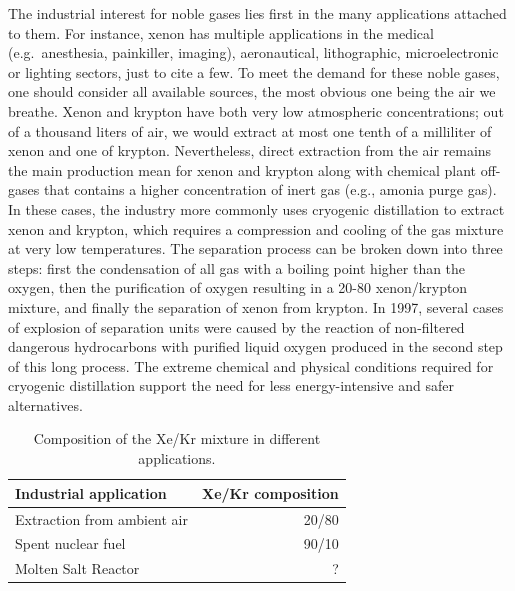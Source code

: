 \documentclass[main.tex]{subfiles}
\begin{document}
The industrial interest for noble gases lies first in the many applications attached to them. For instance, xenon has multiple applications in the medical (e.g.\ anesthesia, painkiller, imaging),\autocite{cullen1951anesthetic, holstrater2011intranasal,Mammarappallil_2019} aeronautical\autocite{Patterson_2002,Coxhill_2005}, lithographic\autocite{Abramov_2018}, microelectronic\autocite{Chang_1995} or lighting sectors,\autocite{Jarman_1974,Tanaka_2019} just to cite a few. To meet the demand for these noble gases, one should consider all available sources, the most obvious one being the air we breathe. Xenon and krypton have both very low atmospheric concentrations; out of a thousand liters of air, we would extract at most one tenth of a milliliter of xenon and one of krypton.\autocite{kerry2007industrial} Nevertheless, direct extraction from the air remains the main production mean for xenon and krypton along with chemical plant off-gases that contains a higher concentration of inert gas (e.g., amonia purge gas). In these cases, the industry more commonly uses cryogenic distillation to extract xenon and krypton, which requires a compression and cooling of the gas mixture at very low temperatures. The separation process can be broken down into three steps: first the condensation of all gas with a boiling point higher than the oxygen, then the purification of oxygen resulting in a 20-80 xenon/krypton mixture, and finally the separation of xenon from krypton. In 1997, several cases of explosion of separation units were caused by the reaction of non-filtered dangerous hydrocarbons with purified liquid oxygen produced in the second step of this long process.\autocite{distill_accident,distill_accident2} The extreme chemical and physical conditions required for cryogenic distillation support the need for less energy-intensive and safer alternatives. 

\setlength{\extrarowheight}{0.1cm}
\begin{table}[ht]
\begin{tabular}{|l|r|}
\hline
 Industrial application  &  Xe/Kr composition  \\
\hline
 Extraction from ambient air\autocite{kerry2007industrial} &  20/80  \\[0.5mm]
 Spent nuclear fuel\autocite{auerbach2003handbook} &  90/10  \\[0.5mm]
 Molten Salt Reactor\autocite{Riley_2019} &  ? \\[0.5mm]
\hline
\end{tabular}
\caption{Composition of the Xe/Kr mixture in different applications.}
\label{tab:indus_app}
\end{table}
\end{document}
